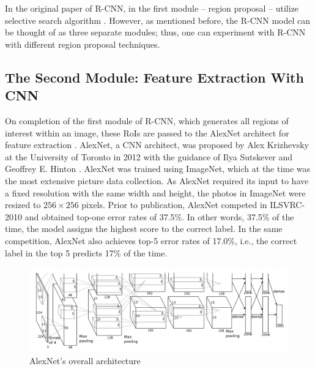 In the original paper of R-CNN, in the first module -- region proposal -- utilize selective search algorithm \cite{Girshick_R_CNN_2013}. However, as mentioned before, the R-CNN model can be thought of as three separate modules; thus, one can experiment with R-CNN with different region proposal techniques.

\subsection{The Second Module: Feature Extraction With CNN}
On completion of the first module of R-CNN, which generates all regions of interest within an image, these RoIs are passed to the AlexNet architect for feature extraction \cite{Girshick_R_CNN_2013}. AlexNet, a CNN architect, was proposed by Alex Krizhevsky at the University of Toronto in 2012 with the guidance of Ilya Sutskever and Geoffrey E. Hinton \cite{AlexNet_2017}. AlexNet was trained using ImageNet, which at the time was the most extensive picture data collection. As AlexNet required its input to have a fixed resolution with the same width and height, the photos in ImageNet were resized to $256 \times 256$ pixels. Prior to publication, AlexNet competed in ILSVRC-2010 and obtained top-one error rates of 37.5\%. In other words, 37.5\% of the time, the model assigns the highest score to the correct label. In the same competition, AlexNet also achieves top-5 error rates of 17.0\%, i.e., the correct label in the top 5 predicts 17\% of the time.

\begin{figure}[!ht]
    \centering
    \includegraphics[width=6in]{figures/alex_net.png}
    \caption{AlexNet's overall architecture \cite{AlexNet_2017}} \label{fig:alex_net_architecture}
\end{figure}

